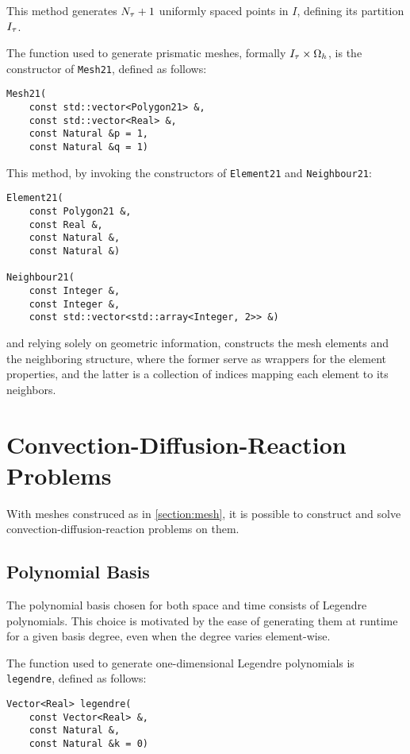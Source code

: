 This method generates $N_{\tau} + 1$ uniformly spaced points in $I$, defining its partition $I_{\tau}$.

The function used to generate prismatic meshes, formally $I_{\tau} \times \Omega_{h}$, is the constructor of \lstinline{Mesh21}, defined as follows:
\begin{lstlisting}[style=cpp]
Mesh21(
    const std::vector<Polygon21> &, 
    const std::vector<Real> &, 
    const Natural &p = 1, 
    const Natural &q = 1)
\end{lstlisting}

This method, by invoking the constructors of \lstinline{Element21} and \lstinline{Neighbour21}:
\begin{lstlisting}[style=cpp]
Element21(
    const Polygon21 &, 
    const Real &, 
    const Natural &, 
    const Natural &)

Neighbour21(
    const Integer &, 
    const Integer &, 
    const std::vector<std::array<Integer, 2>> &)
\end{lstlisting}
and relying solely on geometric information, constructs the mesh elements and the neighboring structure, where the former serve as wrappers for the element properties, and the latter is a collection of indices mapping each element to its neighbors.

\newpage
\section{Convection-Diffusion-Reaction Problems}

With meshes construced as in \cref{section:mesh}, it is possible to construct and solve convection-diffusion-reaction problems on them.

\subsection{Polynomial Basis}

The polynomial basis chosen for both space and time consists of Legendre polynomials. This choice is motivated by the ease of generating them at runtime for a given basis degree, even when the degree varies element-wise.

The function used to generate one-dimensional Legendre polynomials is \lstinline{legendre}, defined as follows:
\begin{lstlisting}[style=cpp]
Vector<Real> legendre(
    const Vector<Real> &, 
    const Natural &, 
    const Natural &k = 0)
\end{lstlisting}


